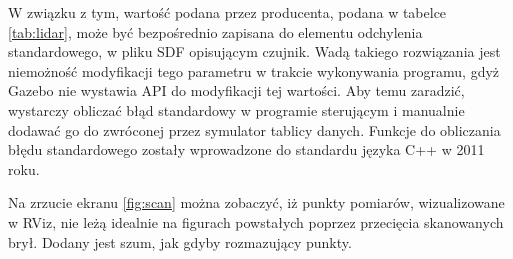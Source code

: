 		W związku z tym, wartość podana przez producenta, podana w tabelce \ref{tab:lidar}, może być bezpośrednio zapisana do 
		elementu odchylenia standardowego, w pliku SDF opisującym czujnik.
		Wadą takiego rozwiązania jest niemożność modyfikacji tego parametru w trakcie wykonywania programu, gdyż Gazebo nie wystawia API do modyfikacji tej wartości.
		Aby temu zaradzić, wystarczy obliczać błąd standardowy w programie sterującym i manualnie dodawać go do zwróconej przez symulator tablicy danych.
		Funkcje do obliczania błędu standardowego zostały wprowadzone do standardu języka C++ w 2011 roku.
		
		Na zrzucie ekranu \ref{fig:scan} można zobaczyć, iż punkty pomiarów, wizualizowane w RViz, nie leżą idealnie na figurach powstałych poprzez przecięcia skanowanych brył.
		Dodany jest szum, jak gdyby rozmazujący punkty.



